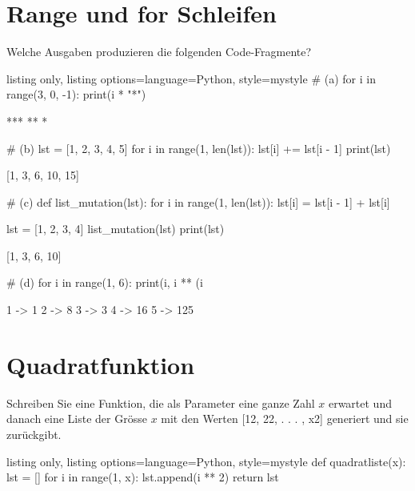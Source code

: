 \documentclass[11pt, oneside]{book}
\begin{document}
\section{Range und for Schleifen}
Welche Ausgaben produzieren die folgenden Code-Fragmente?
\begin{tcblisting}{listing only, listing options={language=Python, style=mystyle}}
# (a)
for i in range(3, 0, -1):
    print(i * "*")

***
**
*

# (b)
lst = [1, 2, 3, 4, 5]
for i in range(1, len(lst)):
    lst[i] += lst[i - 1]
print(lst)

[1, 3, 6, 10, 15]

# (c)
def list_mutation(lst):
    for i in range(1, len(lst)):
        lst[i] = lst[i - 1] + lst[i]

lst = [1, 2, 3, 4]
list_mutation(lst)
print(lst)

[1, 3, 6, 10]

# (d)
for i in range(1, 6):
    print(i, i ** (i %

1 -> 1
2 -> 8
3 -> 3
4 -> 16
5 -> 125
\end{tcblisting}

\newpage
\section{Quadratfunktion}
Schreiben Sie eine Funktion, die als Parameter eine ganze Zahl $x$ erwartet und danach eine Liste der Grösse $x$ mit den Werten [12, 22, . . . , x2] generiert und sie zur\"uckgibt.
\begin{tcblisting}{listing only, listing options={language=Python, style=mystyle}}
def quadratliste(x):
    lst = []
    for i in range(1, x):
        lst.append(i ** 2)
    return lst
\end{tcblisting}
\end{document}
